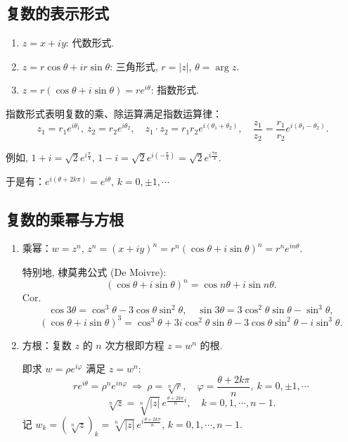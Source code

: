 \documentclass[theorem=false,mathfont=none,openany,sub3section]{easybook}
\begin{document}
\subsection{复数的表示形式}

\begin{enumerate}
  \item $z=x+iy$: 代数形式.
  \item $z=r\cos\theta+ir\sin\theta$: 三角形式, $r=|z|$, $\theta=\arg z$.
  \item $z=r(\cos\theta+i\sin\theta)=re^{i\theta}$: 指数形式.
\end{enumerate}

\begin{remark}
  指数形式表明复数的乘、除运算满足指数运算律：
  \[
  z_{1}=r_{1}e^{i\theta_{1}},\ z_{2}=r_{2}e^{i\theta_{2}},\quad
  z_{1}\cdot z_{2}=r_{1}r_{2}e^{i(\theta_{1}+\theta_{2})},\quad
  \frac{z_{1}}{z_{2}}=\frac{r_{1}}{r_{2}}e^{i(\theta_{1}-\theta_{2})}.
  \]
\end{remark}

例如, $1+i=\sqrt{2}e^{i\frac{\pi}{4}}$, $1-i=\sqrt{2}e^{i(-\frac{\pi}{4})}=\sqrt{2}e^{i\frac{7\pi}{4}}$.

于是有：$e^{i(\theta+2k\pi)}=e^{i\theta}$, $k=0,\pm1,\cdots$

\subsection{复数的乘幂与方根}

\begin{enumerate}
  \item 乘幂：$w=z^{n}$, $z^{n}=(x+iy)^{n}=r^{n}(\cos\theta+i\sin\theta)^{n}=r^{n}e^{in\theta}$.\par
  特别地, 棣莫弗公式 (De Moivre):
  \[
  (\cos\theta+i\sin\theta)^{n}=\cos n\theta+i\sin n\theta.
  \]
  Cor.
  \[
  \cos3\theta=\cos^{3}\theta-3\cos\theta\sin^{2}\theta,\quad
  \sin3\theta=3\cos^{2}\theta\sin\theta-\sin^{3}\theta,
  \]
  \[
  (\cos\theta+i\sin\theta)^{3}
  =\cos^{3}\theta+3i\cos^{2}\theta\sin\theta-3\cos\theta\sin^{2}\theta-i\sin^{3}\theta.
  \]

  \item 方根：复数 $z$ 的 $n$ 次方根即方程 $z=w^{n}$ 的根.\par
  即求 $w=\rho e^{i\varphi}$ 满足 $z=w^{n}$:
  \[
  re^{i\theta}=\rho^{n}e^{in\varphi}\ \Rightarrow\ \rho=\sqrt[n]{r},\quad
  \varphi=\frac{\theta+2k\pi}{n},\ k=0,\pm1,\cdots
  \]
  \[
  \sqrt[n]{z}=\sqrt[n]{|z|}\,e^{\frac{\theta+2k\pi}{n}i},\quad k=0,1,\cdots,n-1.
  \]
  记 $w_{k}=(\sqrt[n]{z})_{k}=\sqrt[n]{|z|}\,e^{i\frac{\theta+2k\pi}{n}}$, $k=0,1,\cdots,n-1$.
\end{enumerate}
\end{document}
